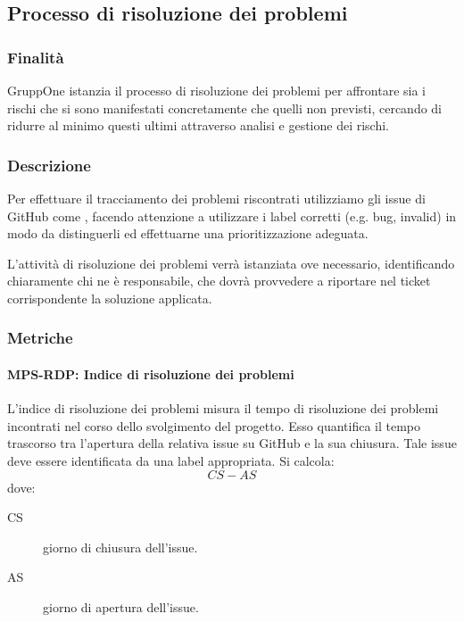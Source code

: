 \documentclass[../norme-di-progetto.tex]{subfiles}
\begin{document}


\subsection{Processo di risoluzione dei problemi}%
\label{sub:processo_di_risoluzione_dei_problemi}

\subsubsection{Finalità}%
\label{subs:processo_di_risoluzione_dei_problemi/finalita}

GruppOne istanzia il processo di risoluzione dei problemi per affrontare sia i rischi che si sono manifestati concretamente che quelli non previsti, cercando di ridurre al minimo questi ultimi attraverso analisi e gestione dei rischi.

\subsubsection{Descrizione}%
\label{subs:processo_di_risoluzione_dei_problemi/descrizione}

Per effettuare il tracciamento dei problemi riscontrati utilizziamo gli issue di GitHub come , facendo attenzione a utilizzare i label corretti (e.g\@. bug, invalid) in modo da distinguerli ed effettuarne una prioritizzazione adeguata.

L'attività di risoluzione dei problemi verrà istanziata ove necessario, identificando chiaramente chi ne è responsabile, che dovrà provvedere a riportare nel ticket corrispondente la soluzione applicata.

\subsubsection{Metriche}%
\label{subs:processo_di_risoluzione_dei_problemi/metriche}

\paragraph{MPS-RDP\@: Indice di risoluzione  dei problemi}%
\label{par:MPS-RDP_indice_di_risoluzione_dei_problemi}

L'indice di risoluzione dei problemi misura il tempo di risoluzione dei problemi incontrati nel corso dello svolgimento del progetto.
Esso quantifica il tempo trascorso tra l'apertura della relativa issue su GitHub e la sua chiusura. Tale issue deve essere identificata da una label appropriata. Si calcola:
\[
  CS-AS 
\]
dove: 
\begin{description}
    \item [CS] giorno di chiusura dell'issue.
    \item [AS] giorno di apertura dell'issue.
\end{description}
\end{document}
